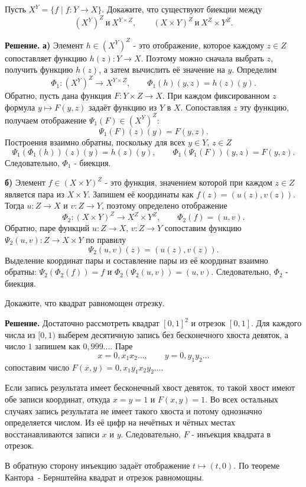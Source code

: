 \begin{problems}
\item Пусть $X^Y=\{f\mid f\colon Y\to X\}$. Докажите, что существуют биекции между
\[
(X^Y)^Z\ \text{и}\ X^{Y\times Z},
\qquad
(X\times Y)^Z\ \text{и}\ X^Z\times Y^Z.
\]
\par\smallskip\noindent\textbf{Решение.} \textbf{а)} Элемент $h\in(X^Y)^Z$ - это отображение, которое каждому $z\in Z$ сопоставляет функцию $h(z)\colon Y\to X$. Поэтому можно сначала выбрать $z$, получить функцию $h(z)$, а затем вычислить её значение на $y$. Определим
\[
\Phi_1\colon(X^Y)^Z\to X^{Y\times Z},\qquad
\Phi_1(h)(y,z)=h(z)(y).
\]
Обратно, пусть дана функция $F\colon Y\times Z\to X$. При каждом фиксированном $z$ формула $y\mapsto F(y,z)$ задаёт функцию из $Y$ в $X$. Сопоставляя $z$ эту функцию, получаем отображение $\Psi_1(F)\in(X^Y)^Z$:
\[
\Psi_1(F)(z)(y)=F(y,z).
\]
Построения взаимно обратны, поскольку для всех $y\in Y$, $z\in Z$
\[
\Psi_1(\Phi_1(h))(z)(y)=h(z)(y),\qquad
\Phi_1(\Psi_1(F))(y,z)=F(y,z).
\]
Следовательно, $\Phi_1$ - биекция.
\par\textbf{б)} Элемент $f\in(X\times Y)^Z$ - это функция, значением которой при каждом $z\in Z$ является пара из $X\times Y$. Запишем её координаты как $f(z)=(u(z),v(z))$. Тогда $u\colon Z\to X$ и $v\colon Z\to Y$, поэтому определено отображение
\[
\Phi_2\colon(X\times Y)^Z\to X^Z\times Y^Z,\qquad
\Phi_2(f)=(u,v).
\]
Обратно, паре функций $u\colon Z\to X$, $v\colon Z\to Y$ сопоставим функцию $\Psi_2(u,v)\colon Z\to X\times Y$ по правилу
\[
\Psi_2(u,v)(z)=(u(z),v(z)).
\]
Выделение координат пары и составление пары из её координат взаимно обратны: $\Psi_2(\Phi_2(f))=f$ и $\Phi_2(\Psi_2(u,v))=(u,v)$. Следовательно, $\Phi_2$ - биекция.\par

\item Докажите, что квадрат равномощен отрезку.
\par\smallskip\noindent\textbf{Решение.} Достаточно рассмотреть квадрат $[0,1]^2$ и отрезок $[0,1]$. Для каждого числа из $[0,1)$ выберем десятичную запись без бесконечного хвоста девяток, а число $1$ запишем как $0{,}999\ldots$. Паре
\[
x=0{,}x_1x_2\ldots,\qquad y=0{,}y_1y_2\ldots
\]
сопоставим число $F(x,y)=0{,}x_1y_1x_2y_2\ldots$.
\par Если запись результата имеет бесконечный хвост девяток, то такой хвост имеют обе записи координат, откуда $x=y=1$ и $F(x,y)=1$. Во всех остальных случаях запись результата не имеет такого хвоста и потому однозначно определяется числом. Из её цифр на нечётных и чётных местах восстанавливаются записи $x$ и $y$. Следовательно, $F$ - инъекция квадрата в отрезок.
\par В обратную сторону инъекцию задаёт отображение $t\mapsto(t,0)$. По теореме Кантора~- Бернштейна квадрат и отрезок равномощны.\par


\end{problems}
